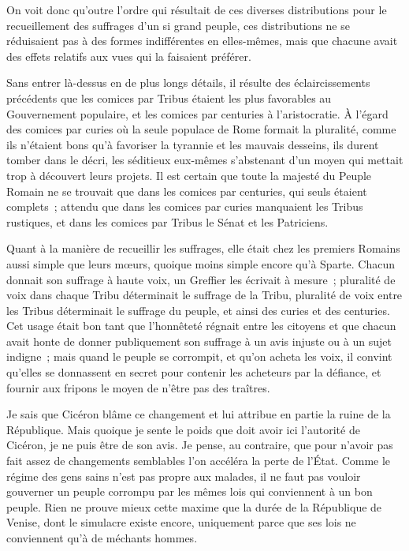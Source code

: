 \documentclass[french,twoside]{book} %
\begin{document}
On voit donc qu’outre l’ordre qui résultait de ces diverses distributions pour le recueillement des suffrages d’un si grand peuple, ces distributions ne se réduisaient pas à des formes indifférentes en elles-mêmes, mais que chacune avait des effets relatifs aux vues qui la faisaient préférer.\par
Sans entrer là-dessus en de plus longs détails, il résulte des éclaircissements précédents que les comices par Tribus étaient les plus favorables au Gouvernement populaire, et les comices par centuries à l’aristocratie. À l’égard des comices par curies où la seule populace de Rome formait la pluralité, comme ils n’étaient bons qu’à favoriser la tyrannie et les mauvais desseins, ils durent tomber dans le décri, les séditieux eux-mêmes s’abstenant d’un moyen qui mettait trop à découvert leurs projets. Il est certain que toute la majesté du Peuple Romain ne se trouvait que dans les comices par centuries, qui seuls étaient complets ; attendu que dans les comices par curies manquaient les Tribus rustiques, et dans les comices par Tribus le Sénat et les Patriciens.\par
Quant à la manière de recueillir les suffrages, elle était chez les premiers Romains aussi simple que leurs mœurs, quoique moins simple encore qu’à Sparte. Chacun donnait son suffrage à haute voix, un Greffier les écrivait à mesure ; pluralité de voix dans chaque Tribu déterminait le suffrage de la Tribu, pluralité de voix entre les Tribus déterminait le suffrage du peuple, et ainsi des curies et des centuries. Cet usage était bon tant que l’honnêteté régnait entre les citoyens et que chacun avait honte de donner publiquement son suffrage à un avis injuste ou à un sujet indigne ; mais quand le peuple se corrompit, et qu’on acheta les voix, il convint qu’elles se donnassent en secret pour contenir les acheteurs par la défiance, et fournir aux fripons le moyen de n’être pas des traîtres.\par
Je sais que Cicéron blâme ce changement et lui attribue en partie la ruine de la République. Mais quoique je sente le poids que doit avoir ici l’autorité de Cicéron, je ne puis être de son avis. Je pense, au contraire, que pour n’avoir pas fait assez de changements semblables l’on accéléra la perte de l’État. Comme le régime des gens sains n’est pas propre aux malades, il ne faut pas vouloir gouverner un peuple corrompu par les mêmes lois qui conviennent à un bon peuple. Rien ne prouve mieux cette maxime que la durée de la République de Venise, dont le simulacre existe encore, uniquement parce que ses lois ne conviennent qu’à de méchants hommes.\par
\end{document}
